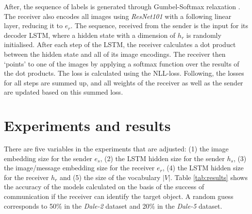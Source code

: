 \documentclass[11pt]{article}
\begin{document}
After, the sequence of labels is generated through Gumbel-Softmax relaxation \citep{Jang2016}.
%
The receiver also encodes all images using \emph{ResNet101} with a following linear layer, reducing it to $e_r$.
The sequence, received from the sender is the input for its decoder LSTM, where a hidden state with a dimension of $h_r$ is randomly initialised.
After each step of the LSTM, the receiver calculates a dot product between the hidden state and all of its image encodings.
The receiver then `points' to one of the images by applying a softmax function over the results of the dot products.
The loss is calculated using the NLL-loss.
Following, the losses for all steps are summed up, and all weights of the receiver as well as the sender are updated based on this summed loss.

\section{Experiments and results}

There are five variables in the experiments that are adjusted:
(1) the image embedding size for the sender $e_s$, (2) the LSTM hidden size for the sender $h_s$, (3) the image/message embedding size for the receiver $e_r$, (4) the LSTM hidden size for the receiver $h_r$ and (5) the size of the vocabulary $|V|$.
%
Table \ref{tab:results} shows the accuracy of the models calculated on the basis of the success of communication if the receiver can identify the target object.
A random guess corresponds to 50\% in the \emph{Dale-2} dataset and 20\% in the \emph{Dale-5} dataset.


\end{document}

